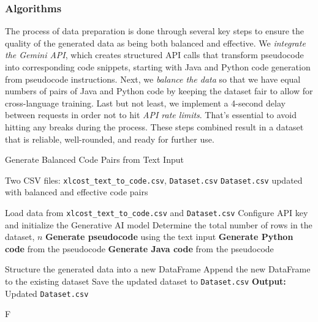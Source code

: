 \documentclass{dhbenelux}
\begin{document}
\subsubsection{Algorithms}

The process of data preparation is done through several key steps to ensure the quality of the generated data as being both balanced and effective. We \textit{integrate the Gemini API}, which creates structured API calls that transform pseudocode into corresponding code snippets, starting with Java and Python code generation from pseudocode instructions. Next, we \textit{balance the data} so that we have equal numbers of pairs of Java and Python code by keeping the dataset fair to allow for cross-language training. Last but not least, we implement a 4-second delay between requests in order not to hit \textit{API rate limits}. That's essential to avoid hitting any breaks during the process. These steps combined result in a dataset that is reliable, well-rounded, and ready for further use.

\begin{algorithm}
\caption{Generate Balanced Code Pairs from Text Input}
\label{alg:balanced_code_pairs}
\begin{algorithmic}[1]
\Require Two CSV files: \texttt{xlcost\_text\_to\_code.csv}, \texttt{Dataset.csv}
\Ensure \texttt{Dataset.csv} updated with balanced and effective code pairs

\State Load data from \texttt{xlcost\_text\_to\_code.csv} and \texttt{Dataset.csv}
\State Configure API key and initialize the Generative AI model
\State Determine the total number of rows in the dataset, $n$
    \State \textbf{Generate pseudocode} using the text input
    \State \textbf{Generate Python code} from the pseudocode
    \State \textbf{Generate Java code} from the pseudocode
 
    \State Structure the generated data into a new DataFrame
    \State Append the new DataFrame to the existing dataset
    \State Save the updated dataset to \texttt{Dataset.csv}
\EndFor
\State \textbf{Output:} Updated \texttt{Dataset.csv}
\end{algorithmic}F
\label{alg:generate-balanced-code}
\end{algorithm}
\end{document}
